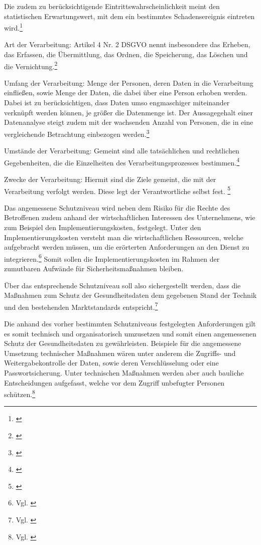 \glqq Die zudem zu berücksichtigende Eintrittswahrscheinlichkeit meint den statistischen Erwartungswert, mit dem ein bestimmtes Schadensereignis eintreten wird.\grqq{}\footnote{\cite[S. 41]{Bundesaerztekammer2020}}

\glqq Art der Verarbeitung: Artikel 4 Nr. 2 DSGVO nennt insbesondere das Erheben, das Erfassen, die Übermittlung, das Ordnen, die Speicherung, das Löschen und die Vernichtung.\grqq{}\footnote{\cite[S. 41]{Bundesaerztekammer2020}}

\glqq Umfang der Verarbeitung: Menge der Personen, deren Daten in die Verarbeitung einfließen, sowie Menge der Daten, die dabei über eine Person erhoben werden. Dabei ist zu berücksichtigen, dass Daten umso engmaschiger miteinander verknüpft werden können, je größer die Datenmenge ist. Der Aussagegehalt einer Datenanalyse steigt zudem mit der wachsenden Anzahl von Personen, die in eine vergleichende Betrachtung einbezogen werden.\grqq{}\footnote{\cite[S. 41]{Bundesaerztekammer2020}}

\glqq Umstände der Verarbeitung: Gemeint sind alle tatsächlichen und rechtlichen Gegebenheiten, die die Einzelheiten des Verarbeitungsprozesses bestimmen.\grqq{}\footnote{\cite[S. 42]{Bundesaerztekammer2020}}

\glqq Zwecke der Verarbeitung: Hiermit sind die Ziele gemeint, die mit der Verarbeitung verfolgt werden. Diese legt der Verantwortliche selbst fest.\grqq{}
\footnote{\cite[S. 42]{Bundesaerztekammer2020}}

Das angemessene Schutzniveau wird neben dem Risiko für die Rechte des Betroffenen zudem anhand der wirtschaftlichen Interessen des Unternehmens, wie zum Beispiel den Implementierungskosten, festgelegt. Unter den Implementierungskosten versteht man die wirtschaftlichen Ressourcen, welche aufgebracht werden müssen, um die erörterten Anforderungen an den Dienst zu integrieren.\footnote{Vgl. \cite[S. 42 f.]{Bundesaerztekammer2020}} Somit sollen die Implementierungskosten im Rahmen der zumutbaren Aufwände für Sicherheitsmaßnahmen bleiben. 

Über das entsprechende Schutzniveau soll also sichergestellt werden, dass die Maßnahmen zum Schutz der Gesundheitsdaten dem gegebenen Stand der Technik und den bestehenden Marktstandards entspricht.\footnote{Vgl. \cite[S. 740]{Kuhnl2018}}

Die anhand des vorher bestimmten Schutzniveaus festgelegten Anforderungen gilt es somit technisch und organisatorisch umzusetzen und somit einen angemessenen Schutz der Gesundheitsdaten zu gewährleisten. Beispiele für die angemessene Umsetzung technischer Maßnahmen wären unter anderem die Zugriffs- und Weitergabekontrolle der Daten, sowie deren Verschlüsselung oder eine Passwortsicherung. Unter technischen Maßnahmen werden aber auch bauliche Entscheidungen aufgefasst, welche vor dem Zugriff unbefugter Personen schützen.\footnote{Vgl. \cite[S. 41 ff.]{Bundesaerztekammer2020}}

